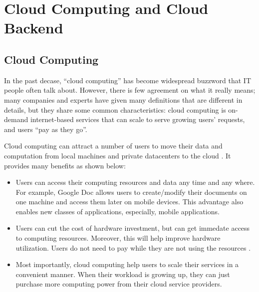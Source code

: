\section{Cloud Computing and Cloud Backend}
\label{bg-cloud}

\subsection{Cloud Computing}

In the past decase, ``cloud computing'' has become widespread buzzword that IT
people often talk about. However, there is few agreement on what it really
means; many companies and experts have given many definitions
\cite{TwentyoneCloudDef, IBMCloudDef, PCMagCloudDef, Foster+08-CloudAndGrid}
that are different in details, but they share some common characteristics: cloud
computing is on-demand internet-based services that can scale to serve growing
users' requests, and users ``pay as they go''.


Cloud computing can attract a number of users to move their data and
computation from local machines and private datacenters to the cloud
\cite{AdobeCloudStat, AWSCustomer, GmailStat, GoogleDriveStat, DropboxStat,
FacebookStat} . It provides many
benefits as shown below:
\begin{itemize}
\item Users can access their computing resources and data any time and any
where. For example, Google Doc allows users to create/modify their documents on
one machine and access them later on mobile devices. This advantage also enables
new classes of applications, especially, mobile applications. 

\item Users can cut the cost of hardware investment, but can get immedate access
to computing resources. Moreover, this will help improve hardware utilization.
Users do not need to pay while they are not using the resources
\cite{Marston+11-CloudBusiness} .

\item Most importantly, cloud computing help users to scale their services in a
convenient manner. When their workload is growing up, they can just purchase
more computing power from their cloud service providers.
\end{itemize}


